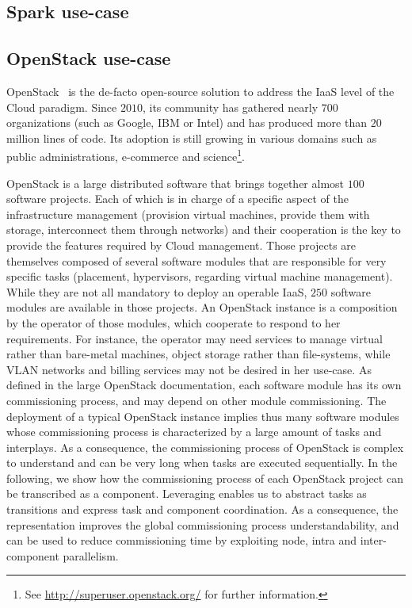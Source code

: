 
\graphicspath{{images/}}

\subsection{Spark use-case}


\subsection{OpenStack use-case}
\label{subsec:openstack}

OpenStack~\cite{os:7923796} is the de-facto open-source solution to address the
IaaS level of the Cloud paradigm. Since $2010$, its community has gathered
nearly $700$ organizations (such as Google, IBM or Intel) and has produced more
than $20$ million lines of code. Its adoption is still growing in various
domains such as public administrations, e-commerce and science\footnote{See
\url{http://superuser.openstack.org/} for further information.}.

OpenStack is a large distributed software that brings together almost $100$
software projects. Each of which is in charge of a specific aspect of the
infrastructure management (\eg provision virtual machines, provide them with
storage, interconnect them through networks) and their cooperation is the key to
provide the features required by Cloud management.
%
Those projects are themselves composed of several software modules that are
responsible for very specific tasks (\eg placement, hypervisors, regarding
virtual machine management). While they are not all mandatory to deploy an
operable IaaS, $250$ software modules are available in those projects.
%
An OpenStack instance is a composition by the operator of those modules, which
cooperate to respond to her requirements. For instance, the operator may need
services to manage virtual rather than bare-metal machines, object storage
rather than file-systems, while VLAN networks and billing services may not be
desired in her use-case. As defined in the large OpenStack documentation, each
software module has its own commissioning process, and may depend on other
module commissioning.
%
The deployment of a typical OpenStack instance implies thus many software
modules whose commissioning process is characterized by a large amount of tasks
and interplays. As a consequence, the commissioning process of OpenStack is
complex to understand and can be very long when tasks are executed sequentially.
%
In the following, we show how the commissioning process of each OpenStack
project can be transcribed as a \mad component. Leveraging \mad enables us to
abstract tasks as transitions and express task and component coordination. As a
consequence, the \mad representation improves the global commissioning process
understandability, and can be used to reduce commissioning time by exploiting
node, intra and inter-component parallelism.


